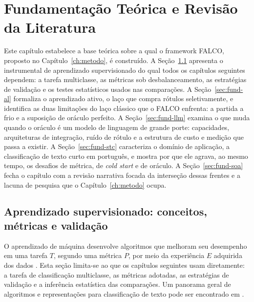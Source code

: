 \chapter{Fundamentação Teórica e Revisão da Literatura}
\label{ch:fundam}


Este capítulo estabelece a base teórica sobre a qual o framework FALCO,
proposto no Capítulo~\ref{ch:metodo}, é construído. A Seção~\ref{sec:fund-super}
apresenta o instrumental de aprendizado supervisionado do qual todos os
capítulos seguintes dependem: a tarefa multiclasse, as métricas sob
desbalanceamento, as estratégias de validação e os testes estatísticos usados
nas comparações. A Seção~\ref{sec:fund-al} formaliza o aprendizado ativo, o
laço que compra rótulos seletivamente, e identifica as duas limitações do laço
clássico que o FALCO enfrenta: a partida a frio e a suposição de oráculo
perfeito. A Seção~\ref{sec:fund-llm} examina o que muda quando o oráculo é um
modelo de linguagem de grande porte: capacidades, arquiteturas de integração,
ruído de rótulo e a estrutura de custo e medição que passa a existir. A
Seção~\ref{sec:fund-stc} caracteriza o domínio de aplicação, a classificação
de texto curto em português, e mostra por que ele agrava, ao mesmo tempo, os
desafios de métrica, de \textit{cold start} e de oráculo. A Seção~\ref{sec:fund-soa}
fecha o capítulo com a revisão narrativa focada da interseção dessas frentes e a
lacuna de pesquisa que o Capítulo~\ref{ch:metodo} ocupa.

\section{Aprendizado supervisionado: conceitos, métricas e validação}
\label{sec:fund-super}

O aprendizado de máquina desenvolve algoritmos que melhoram seu desempenho em
uma tarefa $T$, segundo uma métrica $P$, por meio da experiência $E$ adquirida
dos dados \cite{Mitchell1997}. Esta seção limita-se ao que os capítulos
seguintes usam diretamente: a tarefa de classificação multiclasse, as métricas
adotadas, as estratégias de validação e a inferência estatística das
comparações. Um panorama geral de algoritmos e representações para
classificação de texto pode ser encontrado em \citet{Kowsari2019}.

